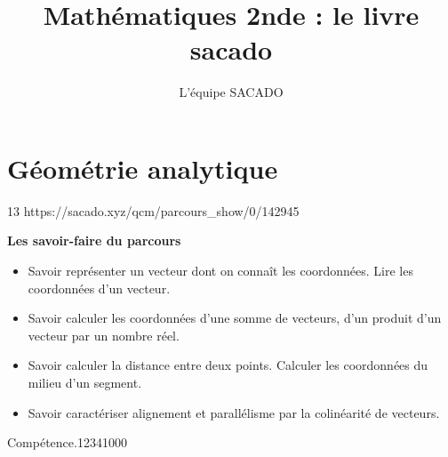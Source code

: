 



\title{Mathématiques 2nde  : le livre sacado}
\author{L'équipe SACADO}




\chapter{Géométrie analytique}{13}
{https://sacado.xyz/qcm/parcours_show/0/142945}
{
 \begin{CpsCol}
	\textbf{Les savoir-faire du parcours}
 	\begin{itemize}
 		\item Savoir représenter un vecteur dont on connaît les coordonnées. Lire les coordonnées d'un
vecteur.
		\item Savoir calculer les coordonnées d'une somme de vecteurs, d'un produit d'un vecteur par un
nombre réel.
		\item Savoir calculer la distance entre deux points. Calculer les coordonnées du milieu d'un
segment.
		\item Savoir caractériser alignement et parallélisme par la colinéarité de vecteurs.
 	\end{itemize}
 \end{CpsCol}

\begin{His}
\end{His}

\begin{ExoDec}{Compétence.}{1234}{1}{0}{0}{0}
\end{ExoDec}
}


